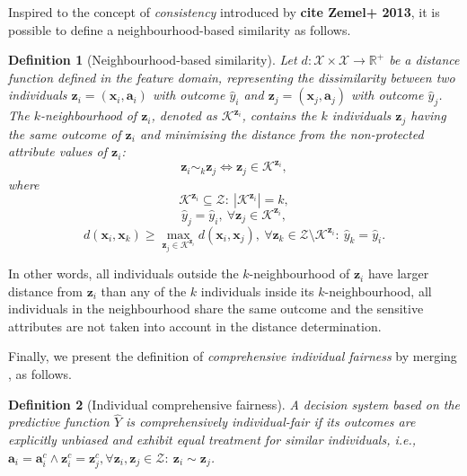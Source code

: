 \documentclass[letterpaper]{article} %
\newtheorem{definition}{Definition}
\begin{document}
Inspired to the concept of \emph{consistency} introduced by \textbf{cite Zemel+ 2013}, it is possible to define a neighbourhood-based similarity as follows.
%
\begin{definition}[Neighbourhood-based similarity]\label{similar_individuals_neigh}
	Let $d: \mathcal{X} \times \mathcal{X} \rightarrow \mathbb{R}^{+}$ be a distance function defined in the feature domain, representing the dissimilarity between two individuals $\boldsymbol{z}_i = (\boldsymbol{x}_i, \boldsymbol{a}_i)$ with outcome $\hat{y}_i$ and $\boldsymbol{z}_j = (\boldsymbol{x}_j, \boldsymbol{a}_j)$ with outcome $\hat{y}_j$.
	The $k$-neighbourhood of $\boldsymbol{z}_i$, denoted as $\mathcal{K}^{\boldsymbol{z}_i}$, contains the $k$ individuals $\boldsymbol{z}_j$ having the same outcome of $\boldsymbol{z}_i$ and minimising the distance from the non-protected attribute values of $\boldsymbol{z}_i$:
	$$ \boldsymbol{z}_i \sim_k \boldsymbol{z}_j \iff \boldsymbol{z}_j \in \mathcal{K}^{\boldsymbol{z}_i}, $$
	where
	$$\mathcal{K}^{\boldsymbol{z}_i} \subseteq \mathcal{Z} : ~ | \mathcal{K}^{\boldsymbol{z}_i} | = k,$$
	$$\hat{y}_j = \hat{y}_i, ~ \forall \boldsymbol{z}_j \in \mathcal{K}^{\boldsymbol{z}_i},$$
	$$d(\boldsymbol{x}_i, \boldsymbol{x}_k) \geq \underset{\boldsymbol{z}_j \in \mathcal{K}^{\boldsymbol{z}_i}}{\max} d(\boldsymbol{x}_i, \boldsymbol{x}_j), ~ \forall \boldsymbol{z}_k \in \mathcal{Z} \setminus \mathcal{K}^{\boldsymbol{z}_i} : ~ \hat{y}_k = \hat{y}_i.$$
\end{definition}
%
\noindent In other words, all individuals outside the $k$-neighbourhood of $\boldsymbol{z}_i$ have larger distance from $\boldsymbol{z}_i$ than any of the $k$ individuals inside its $k$-neighbourhood, all individuals in the neighbourhood share the same outcome and the sensitive attributes are not taken into account in the distance determination.

Finally, we present the definition of \emph{comprehensive individual fairness} by merging , as follows.
%
\begin{definition}[Individual comprehensive fairness]\label{comprehensive}
	A decision system based on the predictive function $\hat{Y}$ is \emph{comprehensively individual-fair} if its outcomes are explicitly unbiased and exhibit equal treatment for similar individuals, i.e., $\boldsymbol{a}_i = \boldsymbol{a}_i^c \wedge \boldsymbol{z}_i^c = \boldsymbol{z}_j^c, \forall \boldsymbol{z}_i, \boldsymbol{z}_j \in \mathcal{Z} : ~ \boldsymbol{z}_i \sim \boldsymbol{z}_j$.
\end{definition}
\end{document}
